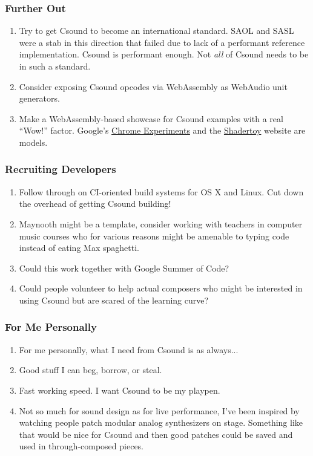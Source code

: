 \documentclass{beamer}
\begin{document}
\begin{frame}[allowframebreaks]
    \frametitle<presentation>{Further Out}
    \begin{enumerate}
        \item     
            Try to get Csound to become an international standard. SAOL and 
SASL were a stab in this direction that failed due to lack of a performant 
reference implementation. Csound is performant enough. Not \textit{all} of 
Csound needs to be in such a standard.
        \item
            Consider exposing Csound opcodes via WebAssembly as WebAudio unit 
generators.
        \item 
            Make a WebAssembly-based showcase for Csound examples with a 
real ``Wow!'' factor. Google's 
\href{https://experiments.withgoogle.com/chrome}{Chrome Experiments} and the 
\href{https://www.shadertoy.com/}{Shadertoy} website are models.
    \end{enumerate}    
\end{frame}

\begin{frame}[allowframebreaks]
    \frametitle<presentation>{Recruiting Developers}
    \begin{enumerate}
        \item     
            Follow through on CI-oriented build systems for OS X and Linux. Cut 
down the overhead of getting Csound building!
        \item   
            Maynooth might be a template, consider working with teachers in 
computer music courses who for various reasons might be amenable to typing 
code instead of eating Max spaghetti.
        \item   
            Could this work together with Google Summer of Code?
        \item   
            Could people volunteer to help actual composers who might be 
interested in using Csound but are scared of the learning curve?
    \end{enumerate}    
\end{frame}

\begin{frame}[allowframebreaks]
    \frametitle<presentation>{For Me Personally}
    \begin{enumerate}
        \item     
            For me personally, what I need from Csound is as 
always...
        \item   
            Good stuff I can beg, borrow, or steal.
        \item   
            Fast working speed. I want Csound to be my playpen.
        \item   
            Not so much for sound design as for live performance, I've been 
inspired by watching people patch modular analog synthesizers on stage. 
Something like that would be nice for Csound and then good patches could be 
saved and used in through-composed pieces.
    \end{enumerate}    
\end{frame}
\end{document}
